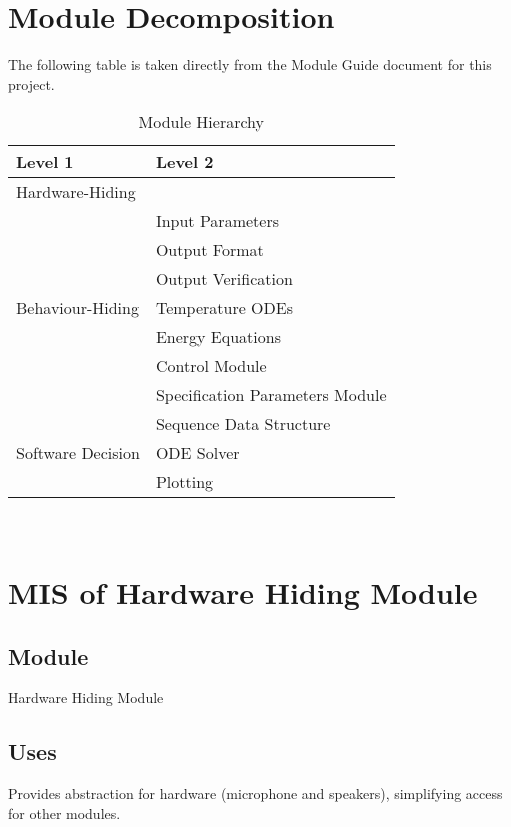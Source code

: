 \documentclass[12pt, titlepage]{article}
\begin{document}
\section{Module Decomposition}

The following table is taken directly from the Module Guide document for this project.

\begin{table}[h!]
\centering
\begin{tabular}{p{} p{}}
\toprule
\textbf{Level 1} & \textbf{Level 2}\\
\midrule

{Hardware-Hiding} & ~ \\
\midrule

\multirow{7}{0.3\textwidth}{Behaviour-Hiding} & Input Parameters\\
& Output Format\\
& Output Verification\\
& Temperature ODEs\\
& Energy Equations\\ 
& Control Module\\
& Specification Parameters Module\\
\midrule

\multirow{3}{0.3\textwidth}{Software Decision} & {Sequence Data Structure}\\
& ODE Solver\\
& Plotting\\
\bottomrule

\end{tabular}
\caption{Module Hierarchy}
\label{TblMH}
\end{table}

\newpage
~\newpage

\section{MIS of Hardware Hiding Module} \label{M1}

\subsection{Module}  
Hardware Hiding Module  

\subsection{Uses}  
Provides abstraction for hardware (microphone and speakers), simplifying access for other modules.  
\end{document}
